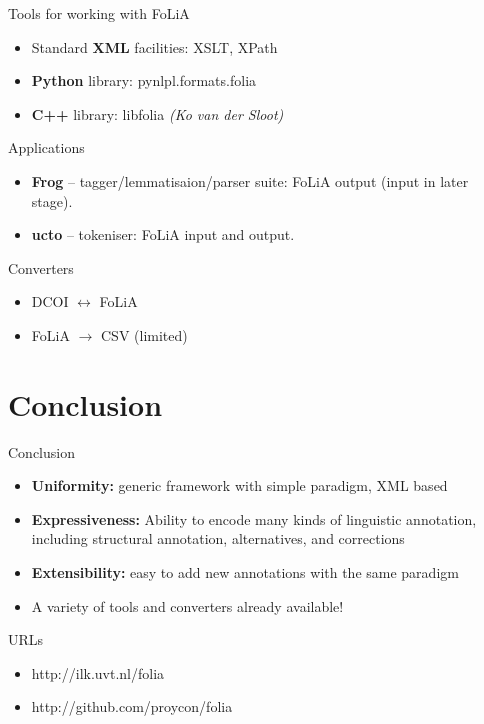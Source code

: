 \documentclass[compress,10pt]{beamer}
\begin{document}
\begin{frame}
	\begin{block}{Tools for working with FoLiA}
		\begin{itemize}
			\item Standard \textbf{XML} facilities: XSLT, XPath
			\item \textbf{Python} library: pynlpl.formats.folia
			\item \textbf{C++} library: libfolia \emph{(Ko van der Sloot)}
		\end{itemize}
	\end{block}
	
	\begin{block}{Applications}
		\begin{itemize}
			\item \textbf{Frog} -- tagger/lemmatisaion/parser suite: FoLiA output (input in later stage).
			\item \textbf{ucto} -- tokeniser: FoLiA input and output.
		\end{itemize}
	\end{block}
	
	\begin{block}{Converters}
		\begin{itemize}
			\item DCOI $\longleftrightarrow$ FoLiA
			\item FoLiA $\longrightarrow$ CSV   (limited)
		\end{itemize}
	\end{block}
\end{frame}


\section{Conclusion}

\begin{frame}
    \begin{block}{Conclusion}
        \begin{itemize}
            \item \textbf{Uniformity:} generic framework with simple paradigm, XML based
            \item \textbf{Expressiveness:} Ability to encode many kinds of linguistic annotation, including structural annotation, alternatives, and corrections
            \item \textbf{Extensibility:} easy to add new annotations with the same paradigm
            \item A variety of tools and converters already available!
        \end{itemize}
    \end{block}
    
    \begin{block}{URLs}
    	\begin{itemize}
    		\item http://ilk.uvt.nl/folia
	    	\item http://github.com/proycon/folia
	    \end{itemize}
    \end{block}

\end{frame}
\end{document}
